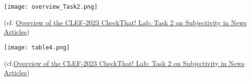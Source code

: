 \documentclass[11pt]{rapport_class}
\begin{document}
\begin{center}
\texttt{[image: overview\_Task2.png]}\\
\begin{tiny}
    (cf. \href{https://ceur-ws.org/Vol-3497/paper-020.pdf}{Overview of the CLEF-2023 CheckThat! Lab: Task 2 on
Subjectivity in News Articles})\\
\end{tiny}
\end{center}

\begin{center}
\texttt{[image: table4.png]}\\
\begin{tiny}
    (cf.\href{https://ceur-ws.org/Vol-3497/paper-020.pdf}{Overview of the CLEF-2023 CheckThat! Lab: Task 2 on
Subjectivity in News Articles})\\
\end{tiny}
\end{center}
\end{document}
